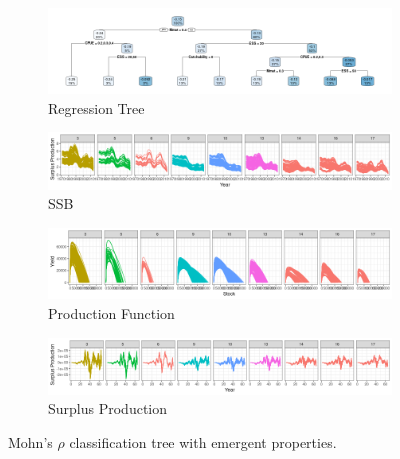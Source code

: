 \newpage
\begin{figure}[!ht]
	\centering
	\begin{subfigure}{0.9\textwidth}
		\centering
		\includegraphics[width=\textwidth]{figures/a-tree-1.png}
		\caption{Regression Tree}
		\label{fig:tree}
	\end{subfigure}
	\hfill
	\begin{subfigure}{0.9\textwidth}  
		\centering 
		\includegraphics[width=\textwidth]{figures/a-tree-biomass-1.png}
		\caption{SSB}
		\label{fig:tree-b}
	\end{subfigure}
	\begin{subfigure}{0.9\textwidth}  
		\centering 
		\includegraphics[width=\textwidth]{figures/a-tree-pf-1.png}
		\caption{Production Function}
		\label{fig:tree-pf}
	\end{subfigure}
	\begin{subfigure}{0.9\textwidth}
		\centering
	    \includegraphics[width=\textwidth]{figures/a-tree-sp-1.png}
		\caption{Surplus Production}
		\label{fig:tree-sp}
	\end{subfigure}
	\caption{Mohn's $\rho$ classification tree with emergent properties.}
	\label{fig:tree}
\end{figure}



